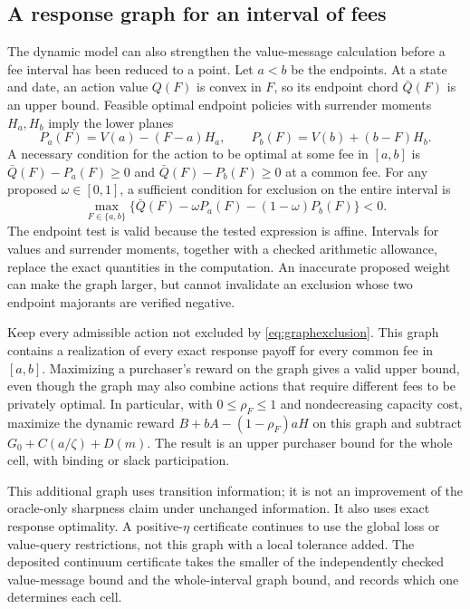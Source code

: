 \subsection{A response graph for an interval of fees}
\label{sec:intervalgraph}
The dynamic model can also strengthen the value-message calculation before a fee interval has been reduced to a point. Let $a<b$ be the endpoints. At a state and date, an action value $Q(F)$ is convex in $F$, so its endpoint chord $\bar Q(F)$ is an upper bound. Feasible optimal endpoint policies with surrender moments $H_a,H_b$ imply the lower planes
\[
 P_a(F)=V(a)-(F-a)H_a,\qquad
 P_b(F)=V(b)+(b-F)H_b.
\]
A necessary condition for the action to be optimal at some fee in $[a,b]$ is
$\bar Q(F)-P_a(F)\geq0$ and $\bar Q(F)-P_b(F)\geq0$ at a common fee. For any proposed $\omega\in[0,1]$, a sufficient condition for exclusion on the entire interval is
\begin{equation}
 \max_{F\in\{a,b\}}
 \{\bar Q(F)-\omega P_a(F)-(1-\omega)P_b(F)\}<0.
 \label{eq:graphexclusion}
\end{equation}
The endpoint test is valid because the tested expression is affine. Intervals for values and surrender moments, together with a checked arithmetic allowance, replace the exact quantities in the computation. An inaccurate proposed weight can make the graph larger, but cannot invalidate an exclusion whose two endpoint majorants are verified negative.

\begin{proposition}
\label{prop:intervalgraph}
Keep every admissible action not excluded by \eqref{eq:graphexclusion}. This graph contains a realization of every exact response payoff for every common fee in $[a,b]$. Maximizing a purchaser's reward on the graph gives a valid upper bound, even though the graph may also combine actions that require different fees to be privately optimal. In particular, with $0\leq\rho_F\leq1$ and nondecreasing capacity cost, maximize the dynamic reward $B+bA-(1-\rho_F)aH$ on this graph and subtract $G_0+C(a/\zeta)+D(m)$. The result is an upper purchaser bound for the whole cell, with binding or slack participation.
\end{proposition}

This additional graph uses transition information; it is not an improvement of the oracle-only sharpness claim under unchanged information. It also uses exact response optimality. A positive-$\eta$ certificate continues to use the global loss or value-query restrictions, not this graph with a local tolerance added. The deposited continuum certificate takes the smaller of the independently checked value-message bound and the whole-interval graph bound, and records which one determines each cell.
